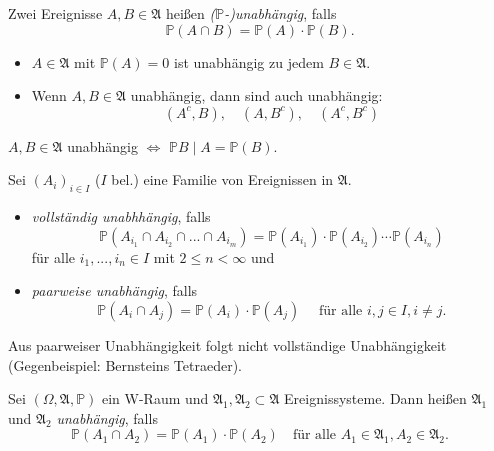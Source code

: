 \documentclass{cheat-sheet}
\newcommand{\Alg}{\mathfrak{A}} %
\renewcommand{\P}{\mathbb{P}} %
\begin{document}


\begin{defn}
  Zwei Ereignisse $A, B \in \Alg$ heißen \emph{($\P$-)unabhängig}, falls
  \[ \P(A \cap B) = \P(A) \cdot \P(B). \]
\end{defn}

\begin{bem}
  \begin{itemize}
    \item $A \in \Alg$ mit $\P(A) = 0$ ist unabhängig zu jedem $B \in \Alg$.
    \item Wenn $A, B \in \Alg$ unabhängig, dann sind auch unabhängig:
    \[ (A^c, B), \quad (A, B^c), \quad (A^c, B^c) \]
  \end{itemize}
\end{bem}

\begin{satz}
  $A, B \in \Alg$ unabhängig $\iff$ $\P{B \mid A} = \P(B)$.
\end{satz}


\begin{defn}
  Sei $(A_i)_{i \in I}$ ($I$ bel.) eine Familie von Ereignissen in $\Alg$.
  \begin{itemize}
    \item \emph{vollständig unabhhängig}, falls
    \[ \P(A_{i_1} \cap A_{i_2} \cap ... \cap A_{i_m}) = \P(A_{i_1}) \cdot \P(A_{i_2}) \cdots \P(A_{i_n}) \]
    für alle $i_1, ..., i_n \in I$ mit $2 \leq n < \infty$ und
    \item \emph{paarweise unabhängig}, falls
    \[ \P(A_i \cap A_j) = \P(A_i) \cdot \P(A_j) \quad \text{ für alle } i, j \in I, i \not= j. \]
  \end{itemize}
\end{defn}

\begin{acht}
  Aus paarweiser Unabhängigkeit folgt nicht vollständige Unabhängigkeit (Gegenbeispiel: Bernsteins Tetraeder).
\end{acht}

\begin{defn}
  Sei $(\Omega, \Alg, \P)$ ein W-Raum und $\Alg_1, \Alg_2 \subset \Alg$ Ereignissysteme. Dann heißen $\Alg_1$ und $\Alg_2$ \emph{unabhängig}, falls
  \[ \P(A_1 \cap A_2) = \P(A_1) \cdot \P(A_2) \quad \text{für alle } A_1 \in \Alg_1, A_2 \in \Alg_2. \]
\end{defn}
\end{document}
